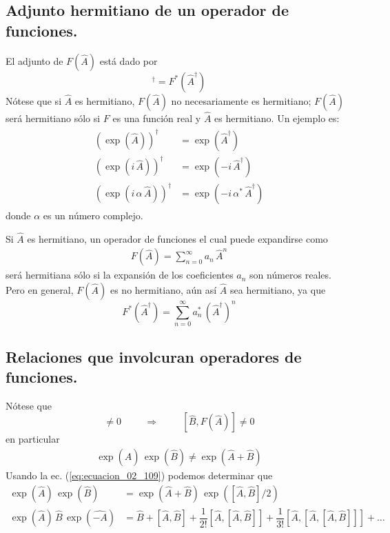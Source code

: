 \subsection*{Adjunto hermitiano de un operador de funciones.}
El adjunto de $F(\hat{A})$ está dado por
\begin{equation}
[F(\hat{A})]^{\dagger} = F^{*}(\hat{A}^{\dagger})
\label{eq:ecuacion_02_112}
\end{equation}
Nótese que si $\hat{A}$ es hermitiano, $F(\hat{A})$ no necesariamente es hermitiano; $F(\hat{A})$ será hermitiano sólo si $F$ es una función real y $\hat{A}$ es hermitiano. Un ejemplo es:
\begin{align}
\begin{aligned}
\left( \exp(\hat{A}) \right)^{\dagger} &= \exp(\hat{A}^{\dagger}) \\[1em]
\left( \exp(i \, \hat{A}) \right)^{\dagger} &= \exp(-i \, \hat{A}^{\dagger}) \\[1em]
\left( \exp(i \, \alpha \, \hat{A}) \right)^{\dagger} &= \exp(-i \, \alpha^{*} \, \hat{A}^{\dagger})
\end{aligned}
\label{eq:ecuacion_02_113}
\end{align}
donde $\alpha$ es un número complejo.
\par
Si $\hat{A}$ es hermitiano, un operador de funciones el cual puede expandirse como
\begin{align*}
F(\hat{A}) = \sum_{n=0}^{\infty} a_{n} \, \hat{A}^{n}
\end{align*}
será hermitiana sólo si la expansión de los coeficientes $a_{n}$ son números reales. Pero en general, $F(\hat{A})$ es no hermitiano, aún así $\hat{A}$ sea hermitiano, ya que
\begin{equation}
F^{*}(\hat{A}^{\dagger}) = \sum_{n=0}^{\infty} a_{n}^{*} \, (\hat{A}^{\dagger})^{n}
\label{eq:ecuacion_02_114}
\end{equation}
\subsection*{Relaciones que involcuran operadores de funciones.}
Nótese que
\begin{equation}
[\hat{A}, \hat{B}] \neq 0 \hspace{1cm} \Longrightarrow \hspace{1cm} [\hat{B} , F(\hat{A}) ] \neq 0
\label{eq:ecuacion_02_115}
\end{equation}
en particular
\begin{align*}
\exp(\hat{A}) \, \exp(\hat{B}) \neq \exp(\hat{A} + \hat{B})
\end{align*}
Usando la ec. (\ref{eq:ecuacion_02_109}) podemos determinar que
\begin{align}
\exp(\hat{A}) \, \exp(\hat{B}) &= \exp(\hat{A} + \hat{B}) \, \exp([\hat{A}, \hat{B}]/2) \label{eq:ecuacion_02_116} \\[1em]
\exp(\hat{A}) \, \hat{B} \, \exp(\hat{-A}) &= \hat{B} + [\hat{A}, \hat{B}] + \dfrac{1}{2!} [\hat{A}, [\hat{A}, \hat{B}]] + \dfrac{1}{3!} [\hat{A}, [ \hat{A}, [\hat{A}, \hat{B}]]] + \ldots \label{eq:ecuacion_02_117}
\end{align}

